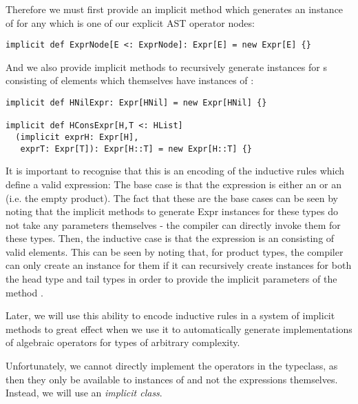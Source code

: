 Therefore we must first provide an implicit method which generates an instance of  for any  which is one of our explicit AST operator nodes:
\vs\begin{lstlisting}
implicit def ExprNode[E <: ExprNode]: Expr[E] = new Expr[E] {}
\end{lstlisting} \vs
And we also provide implicit methods to recursively generate instances for s consisting of elements which themselves have instances of :
\vs\begin{lstlisting}
implicit def HNilExpr: Expr[HNil] = new Expr[HNil] {}

implicit def HConsExpr[H,T <: HList]
  (implicit exprH: Expr[H],
   exprT: Expr[T]): Expr[H::T] = new Expr[H::T] {}
\end{lstlisting}\vs
It is important to recognise that this is an encoding of the inductive rules which define a valid expression: The base case is that the expression is either an  or an  (i.e. the empty product). The fact that these are the base cases can be seen by noting that the implicit methods to generate Expr instances for these types do not take any parameters themselves - the compiler can directly invoke them for these types. Then, the inductive case is that the expression is an  consisting of valid  elements. This can be seen by noting that, for product types, the compiler can only create an  instance for them if it can recursively create  instances for both the head type and tail types in order to provide the implicit parameters of the method .

Later, we will use this ability to encode inductive rules in a system of implicit methods to great effect when we use it to automatically generate implementations of algebraic operators for types of arbitrary complexity.

\vs Unfortunately, we cannot directly implement the operators in the  typeclass, as then they only be available to instances of  and not the expressions themselves. Instead, we will use an \textit{implicit class}.

